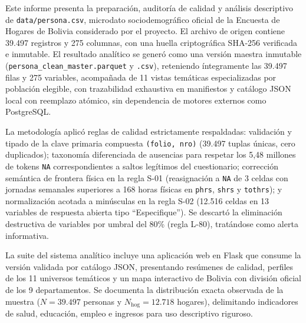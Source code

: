 \noindent
Este informe presenta la preparación, auditoría de calidad y análisis descriptivo de \texttt{data/persona.csv}, microdato sociodemográfico oficial de la Encuesta de Hogares de Bolivia considerado por el proyecto. El archivo de origen contiene 39.497 registros y 275 columnas, con una huella criptográfica SHA-256 verificada e inmutable. El resultado analítico se generó como una versión maestra inmutable (\texttt{persona\_clean\_master.parquet} y \texttt{.csv}), reteniendo íntegramente las 39.497 filas y 275 variables, acompañada de 11 vistas temáticas especializadas por población elegible, con trazabilidad exhaustiva en manifiestos y catálogo JSON local con reemplazo atómico, sin dependencia de motores externos como PostgreSQL.

La metodología aplicó reglas de calidad estrictamente respaldadas: validación y tipado de la clave primaria compuesta \texttt{(folio, nro)} (39.497 tuplas únicas, cero duplicados); taxonomía diferenciada de ausencias para respetar los 5,48 millones de tokens \texttt{NA} correspondientes a saltos legítimos del cuestionario; corrección semántica de frontera física en la regla S-01 (reasignación a \texttt{NA} de 3 celdas con jornadas semanales superiores a 168 horas físicas en \texttt{phrs}, \texttt{shrs} y \texttt{tothrs}); y normalización acotada a minúsculas en la regla S-02 (12.516 celdas en 13 variables de respuesta abierta tipo ``Especifique''). Se descartó la eliminación destructiva de variables por umbral del 80\% (regla L-80), tratándose como alerta informativa.

La suite del sistema analítico incluye una aplicación web en Flask que consume la versión validada por catálogo JSON, presentando resúmenes de calidad, perfiles de los 11 universos temáticos y un mapa interactivo de Bolivia con división oficial de los 9 departamentos. Se documenta la distribución exacta observada de la muestra ($N = 39.497$ personas y $N_{\text{hog}} = 12.718$ hogares), delimitando indicadores de salud, educación, empleo e ingresos para uso descriptivo riguroso.
